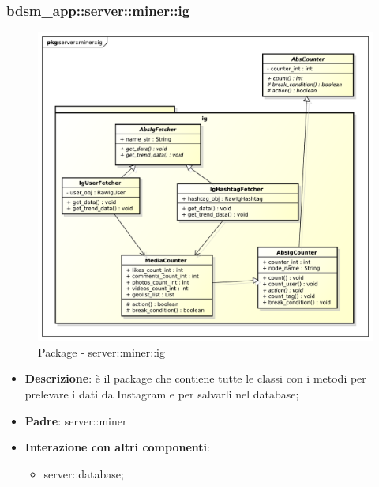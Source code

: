 \subsubsection{bdsm\_app::server::miner::ig} %
\label{ssub:bdsm_app_server_miner_ig}
\begin{figure}[htbp]
	\centering
	\centerline{\includegraphics[scale=0.4]{./images/server/miner_ig.pdf}}
	\caption{Package - server::miner::ig}
\end{figure}


\begin{itemize}
  \item \textbf{Descrizione}: è il package che contiene tutte le classi con i metodi per prelevare i dati da Instagram e per salvarli nel database;
  \item \textbf{Padre}: server::miner
   \item \textbf{Interazione con altri componenti}:
  	\begin{itemize}
  		\item server::database;
  	\end{itemize}
\end{itemize}	

